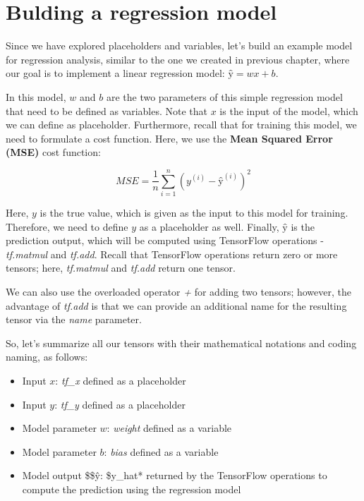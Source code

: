 \documentclass[11pt]{article}
\providecommand{\tightlist}{%
      \setlength{\itemsep}{0pt}\setlength{\parskip}{0pt}}
\begin{document}
    \section{Bulding a regression model}\label{bulding-a-regression-model}

    Since we have explored placeholders and variables, let's build an
example model for regression analysis, similar to the one we created in
previous chapter, where our goal is to implement a linear regression
model: \(ŷ = wx + b\).

In this model, \(w\) and \(b\) are the two parameters of this simple
regression model that need to be defined as variables. Note that \(x\)
is the input of the model, which we can define as placeholder.
Furthermore, recall that for training this model, we need to formulate a
cost function. Here, we use the \textbf{Mean Squared Error (MSE)} cost
function:

\[MSE = \frac{1}{n}\sum_{i=1}^n \left(y^{(i)}-ŷ^{(i)}\right)^2\]

Here, \(y\) is the true value, which is given as the input to this model
for training. Therefore, we need to define \(y\) as a placeholder as
well. Finally, \(ŷ\) is the prediction output, which will be computed
using TensorFlow operations - \emph{tf.matmul} and \emph{tf.add}. Recall
that TensorFlow operations return zero or more tensors; here,
\emph{tf.matmul} and \emph{tf.add} return one tensor.

We can also use the overloaded operator \emph{+} for adding two tensors;
however, the advantage of \emph{tf.add} is that we can provide an
additional name for the resulting tensor via the \emph{name} parameter.

So, let's summarize all our tensors with their mathematical notations
and coding naming, as follows:

\begin{itemize}
\tightlist
\item
  Input \(x\): \emph{tf\_x} defined as a placeholder
\item
  Input \(y\): \emph{tf\_y} defined as a placeholder
\item
  Model parameter \(w\): \emph{weight} defined as a variable
\item
  Model parameter \(b\): \emph{bias} defined as a variable
\item
  Model output \$\$ŷ: \$y\_hat* returned by the TensorFlow operations to
  compute the prediction using the regression model
\end{itemize}
\end{document}
